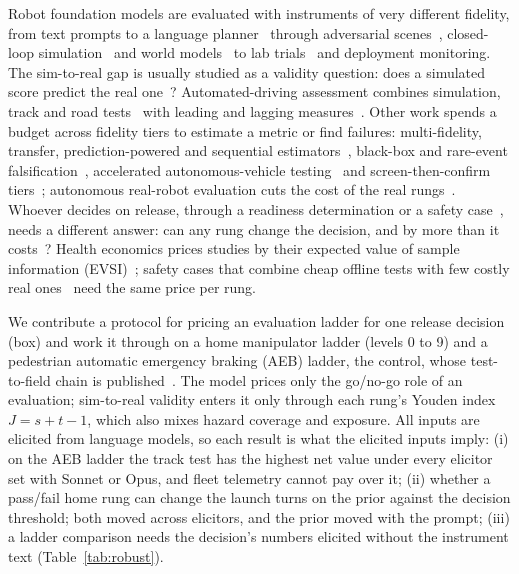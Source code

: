 \documentclass{article}
\begin{document}
Robot foundation models are evaluated with instruments of very different fidelity, from text prompts to a language planner~\citep{obi2025safeplan} through adversarial scenes~\citep{majumdar2025predictive}, closed-loop simulation~\citep{fan2026safevlabench} and world models~\citep{geminirobotics2025veo} to lab trials~\citep{zhang2026redvla} and deployment monitoring. The sim-to-real gap is usually studied as a validity question: does a simulated score predict the real one~\citep{kadian2020sim2real,li2024simpler,gervet2023navigating,dauner2024navsim,luo2025sim2val,stocco2023mindgap}? Automated-driving assessment combines simulation, track and road tests~\citep{reckenzaun2024natm} with leading and lagging measures~\citep{fraadeblanar2018measuring}. Other work spends a budget across fidelity tiers to estimate a metric or find failures: multi-fidelity, transfer, prediction-powered and sequential estimators~\citep{peherstorfer2018survey,winkelmann2022transfer,angelopoulos2023ppi,mahboob2026betting,snyder2026beyond,kressgazit2024empirical}, black-box and rare-event falsification~\citep{corso2021survey,okelly2018scalable}, accelerated autonomous-vehicle testing~\citep{glasmacher2023acquire,feng2023dense,yang2022sparse} and screen-then-confirm tiers~\citep{barrett2024benchmarkearly}; autonomous real-robot evaluation cuts the cost of the real rungs~\citep{zhou2025autoeval,atreya2025roboarena}. Whoever decides on release, through a readiness determination or a safety case~\citep{webb2020waymo,ul2020ul4600,buhl2024safetycases}, needs a different answer: can any rung change the decision, and by more than it costs~\citep{raiffa1961applied,howard1966information,koopman2020positive}? Health economics prices studies by their expected value of sample information (EVSI)~\citep{ades2004evsi}; safety cases that combine cheap offline tests with few costly real ones~\citep{sinha2026rethinking,shevlane2023extreme} need the same price per rung.

We contribute a protocol for pricing an evaluation ladder for one release decision (box) and work it through on a home manipulator ladder (levels 0 to 9) and a pedestrian automatic emergency braking (AEB) ladder, the control, whose test-to-field chain is published~\citep{iihs2024paeb,cicchino2022pedestrian}. The model prices only the go/no-go role of an evaluation; sim-to-real validity enters it only through each rung's Youden index $J=s+t-1$, which also mixes hazard coverage and exposure. All inputs are elicited from language models, so each result is what the elicited inputs imply: (i) on the AEB ladder the track test has the highest net value under every elicitor set with Sonnet or Opus, and fleet telemetry cannot pay over it; (ii) whether a pass/fail home rung can change the launch turns on the prior against the decision threshold; both moved across elicitors, and the prior moved with the prompt; (iii) a ladder comparison needs the decision's numbers elicited without the instrument text (Table~\ref{tab:robust}).
\end{document}
